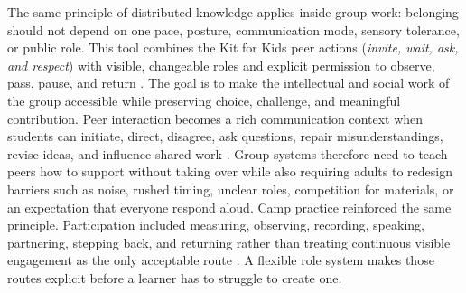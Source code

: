 
\vspace{-0.5cm}

The same principle of distributed knowledge applies inside group work: belonging should not depend on one pace, posture, communication mode, sensory tolerance, or public role. This tool combines the Kit for Kids peer actions (\textit{invite, wait, ask, and respect}) with visible, changeable roles and explicit permission to observe, pass, pause, and return \citep{oar2026kit,oar2026tips}. The goal is to make the intellectual and social work of the group accessible while preserving choice, challenge, and meaningful contribution. Peer interaction becomes a rich communication context when students can initiate, direct, disagree, ask questions, repair misunderstandings, revise ideas, and influence shared work \citep{downing2015classroom}. Group systems therefore need to teach peers how to support without taking over while also requiring adults to redesign barriers such as noise, rushed timing, unclear roles, competition for materials, or an expectation that everyone respond aloud. Camp practice reinforced the same principle. Participation included measuring, observing, recording, speaking, partnering, stepping back, and returning rather than treating continuous visible engagement as the only acceptable route \citep{campEvidence2026}. A flexible role system makes those routes explicit before a learner has to struggle to create one.


\renewcommand{\arraystretch}{1.0}
\setlength{\tabcolsep}{3pt}

